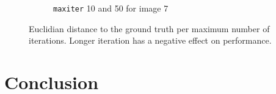 \documentclass[a4paper,titlepage,12pt]{article}
\begin{document}
\begin{figure}
\begin{subfigure}{0.57\linewidth}
		\caption{\texttt{maxiter} 10 and 50 for image 7}
	\end{subfigure}
	\caption{Euclidian distance to the ground truth per maximum number of iterations. Longer iteration has a negative effect on performance. } %
	\label{fig:sol}
\end{figure}

\section{Conclusion}
\label{sec:concl}




\end{document}
